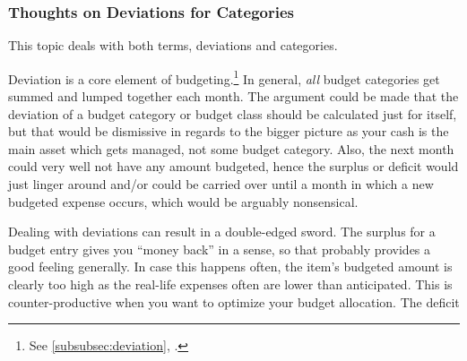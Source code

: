 \subsubsection{Thoughts on Deviations for Categories}
\label{subsubsec:thoughts-deviations-for-categories}

This topic deals with both terms, deviations and categories.

Deviation is a core element of budgeting.\footnote{See \autoref{subsubsec:deviation}, .}
In general, \emph{all} budget categories get summed and lumped together each month.
The argument could be made that the deviation of a budget category or budget class should be calculated just for itself, but that would be dismissive in regards to the bigger picture as your cash is the main asset which gets managed, not some budget category.
Also, the next month could very well not have any amount budgeted, hence the surplus or deficit would just linger around and/or could be carried over until a month in which a new budgeted expense occurs, which would be arguably nonsensical.

Dealing with deviations can result in a double-edged sword.
The surplus for a budget entry gives you ``money back'' in a sense, so that probably provides a good feeling generally.
In case this happens often, the item's budgeted amount is clearly too high as the real-life expenses often are lower than anticipated.
This is counter-productive when you want to optimize your budget allocation.
The deficit 